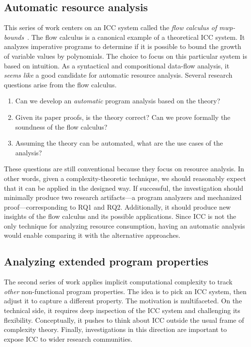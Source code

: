 \subsection{Automatic resource analysis}
\label{subsec:aicc-automatic-resource-analysis}

This series of work centers on an ICC system called the \emph{flow calculus of mwp-bounds}~\cite{jones2009}.
The flow calculus is a canonical example of a theoretical ICC system.
It analyzes imperative programs to determine if it is possible to bound the growth of variable values by polynomials.
The choice to focus on this particular system is based on intuition.
As a syntactical and compositional data-flow analysis, it \emph{seems like} a good candidate for automatic resource analysis.
Several research questions arise from the flow calculus.

\begin{enumerate}[label={(RQ\arabic*)}]
\item Can we develop an \emph{automatic} program analysis based on the theory?
\item Given its paper proofs, is the theory correct?
      Can we prove formally the soundness of the flow calculus?
\item Assuming the theory can be automated, what are the use cases of the analysis?
\end{enumerate}
These questions are still conventional because they focus on resource analysis.
In other words, given a complexity-theoretic technique, we should reasonably expect that it can be applied in the designed way.
If successful, the investigation should minimally produce two research artifacts---a program analyzers and mechanized proof---corresponding to RQ1 and RQ2.
Additionally, it should produce new insights of the flow calculus and its possible applications.
Since ICC is not the only technique for analyzing resource consumption,
having an automatic analysis would enable comparing it with the alternative approaches.

\subsection{Analyzing extended program properties}
\label{subsec:extended-props}

The second series of work applies implicit computational complexity to track \emph{other} non-functional program properties.
The idea is to pick an ICC system, then adjust it to capture a different  property.
The motivation is multifaceted.
On the technical side, it requires deep inspection of the ICC system and challenging its flexibility.
Conceptually, it pushes to think about ICC outside the usual frame of complexity theory.
Finally, investigations in this direction are important to expose ICC to wider research communities.

